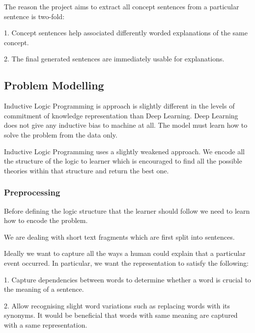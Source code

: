 The reason the project aims to extract all concept sentences from a particular sentence is two-fold:

 1. Concept sentences help associated differently worded explanations of the same concept.

 2. The final generated sentences are immediately usable for explanations.

\subsection{Problem Modelling}


Inductive Logic Programming is approach is slightly different in the levels of commitment of knowledge representation than Deep Learning.
Deep Learning does not give any inductive bias to machine at all. 
The model must learn how to solve the problem from the data only.

Inductive Logic Programming uses a slightly weakened approach. 
We encode all the structure of the logic to learner which is encouraged to find all the possible theories within that structure and return the best one. 



\subsubsection{Preprocessing}

Before defining the logic structure that the learner should follow we need to learn how to encode the problem.

We are dealing with short text fragments which are first split into sentences.



Ideally we want to capture all the ways a human could explain that a particular event occurred.
In particular, we want the representation to satisfy the following:

1. Capture dependencies between words to determine whether a word is crucial to the meaning of a sentence.

2. Allow recognising slight word variations such as replacing words with its synonyms. It would be beneficial that words with same meaning are captured with a same representation.

